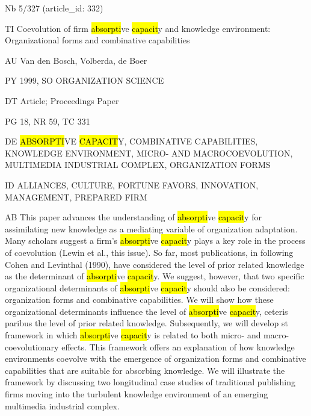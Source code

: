 \documentclass[a4paper]{article}
\begin{document}
\vspace*{-2cm}
Nb \tabto{0cm}5/327 (article\_id: 332)\par
TI \tabto{0cm}Coevolution of firm \hl{absorpti}ve \hl{capacit}y and knowledge environment: Organizational forms and combinative capabilities\par
AU \tabto{0cm}Van den Bosch, Volberda, de Boer\par
PY \tabto{0cm}1999, SO ORGANIZATION SCIENCE\par
DT \tabto{0cm}Article; Proceedings Paper\par
PG \tabto{0cm}18, NR 59, TC 331\par
DE \tabto{0cm}\hl{ABSORPTI}VE \hl{CAPACIT}Y, COMBINATIVE CAPABILITIES, KNOWLEDGE ENVIRONMENT, MICRO- AND MACROCOEVOLUTION, MULTIMEDIA INDUSTRIAL COMPLEX, ORGANIZATION FORMS\par
ID \tabto{0cm}ALLIANCES, CULTURE, FORTUNE FAVORS, INNOVATION, MANAGEMENT, PREPARED FIRM\par
AB \tabto{0cm}This paper advances the understanding of \hl{absorpti}ve \hl{capacit}y for assimilating new knowledge as a mediating variable of organization adaptation. Many scholars suggest a firm's \hl{absorpti}ve \hl{capacit}y plays a key role in the process of coevolution (Lewin et al., this issue). So far, most publications, in following Cohen and Levinthal (1990), have considered the level of prior related knowledge as the determinant of \hl{absorpti}ve \hl{capacit}y. We suggest, however, that two specific organizational determinants of \hl{absorpti}ve \hl{capacit}y should also be considered: organization forms and combinative capabilities. We will show how these organizational determinants influence the level of \hl{absorpti}ve \hl{capacit}y, ceteris paribus the level of prior related knowledge. Subsequently, we will develop st framework in which \hl{absorpti}ve \hl{capacit}y is related to both micro- and macro-coevolutionary effects. This framework offers an explanation of how knowledge environments coevolve with the emergence of organization forms and combinative capabilities that are suitable for absorbing knowledge. We will illustrate the framework by discussing two longitudinal case studies of traditional publishing firms moving into the turbulent knowledge environment of an emerging multimedia industrial complex.\par
\clearpage
\end{document}
